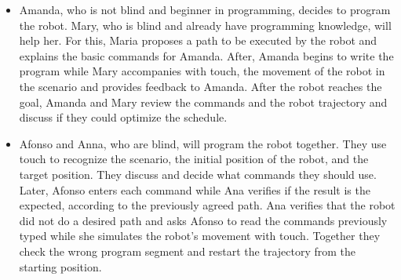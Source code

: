 \begin{itemize}
    \item Amanda, who is not blind and beginner in programming, decides to program the robot. Mary, who is blind and already have programming knowledge, will help her. For this, Maria proposes a path to be executed by the robot and explains the basic commands for Amanda. After, Amanda begins to write the program while Mary accompanies with touch, the movement of the robot in the scenario and provides feedback to Amanda. After the robot reaches the goal, Amanda and Mary review the commands and the robot trajectory and discuss if they could optimize the schedule.
    
    \item Afonso and Anna, who are blind, will program the robot together. They use touch to recognize the scenario, the initial position of the robot, and the target position. They discuss and decide what commands they should use. Later, Afonso enters each command while Ana verifies if the result is the expected, according to the previously agreed path. Ana verifies that the robot did not do a desired path and asks Afonso to read the commands previously typed while she simulates the robot's movement with touch. Together they check the wrong program segment and restart the trajectory from the starting position.
    


\end{itemize}
